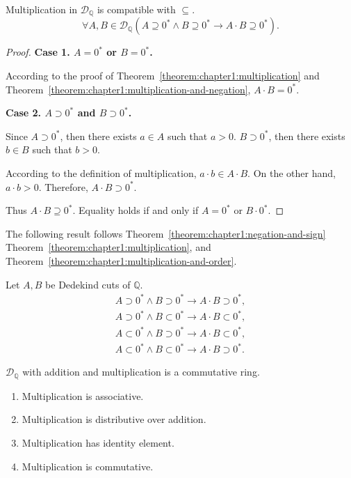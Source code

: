 \begin{theorem}\label{theorem:chapter1:multiplication-and-order}
    Multiplication in $\mathscr{D}_{\mathbb{Q}}$ is compatible with $\subseteq$.
    \[
        \forall A, B\in\mathscr{D}_{\mathbb{Q}}(A\supseteq {0}^{*}\land B\supseteq {0}^{*}\rightarrow A\cdot B\supseteq {0}^{*}).
    \]
\end{theorem}

\begin{proof}
    \textbf{Case 1. $A = {0}^{*}$ or $B = {0}^{*}$.}

    According to the proof of Theorem~\ref{theorem:chapter1:multiplication} and Theorem~\ref{theorem:chapter1:multiplication-and-negation}, $A\cdot B = {0}^{*}$.
    \bigskip

    \textbf{Case 2. $A\supset {0}^{*}$ and $B\supset {0}^{*}$.}

    Since $A\supset {0}^{*}$, then there exists $a\in A$ such that $a > 0$. $B\supset {0}^{*}$, then there exists $b\in B$ such that $b > 0$.

    According to the definition of multiplication, $a\cdot b\in A\cdot B$. On the other hand, $a\cdot b > 0$. Therefore, $A\cdot B\supset {0}^{*}$.

    \bigskip
    Thus $A\cdot B\supseteq {0}^{*}$. Equality holds if and only if $A = {0}^{*}$ or $B\cdot {0}^{*}$.
\end{proof}

The following result follows Theorem~\ref{theorem:chapter1:negation-and-sign} Theorem~\ref{theorem:chapter1:multiplication}, and Theorem~\ref{theorem:chapter1:multiplication-and-order}.

\begin{corollary}
    Let $A, B$ be Dedekind cuts of $\mathbb{Q}$.
    \[
        \begin{split}
            A\supset {0}^{*}\land B\supset {0}^{*}\rightarrow A\cdot B\supset {0}^{*}, \\
            A\supset {0}^{*}\land B\subset {0}^{*}\rightarrow A\cdot B\subset {0}^{*}, \\
            A\subset {0}^{*}\land B\supset {0}^{*}\rightarrow A\cdot B\subset {0}^{*}, \\
            A\subset {0}^{*}\land B\subset {0}^{*}\rightarrow A\cdot B\supset {0}^{*}.
        \end{split}
    \]
\end{corollary}

\begin{theorem}
    $\mathscr{D}_{\mathbb{Q}}$ with addition and multiplication is a commutative ring.
    \begin{enumerate}[label={(F\arabic*)},itemsep=0pt]
        \item Multiplication is associative.
        \item Multiplication is distributive over addition.
        \item Multiplication has identity element.
        \item Multiplication is commutative.
    \end{enumerate}
\end{theorem}

